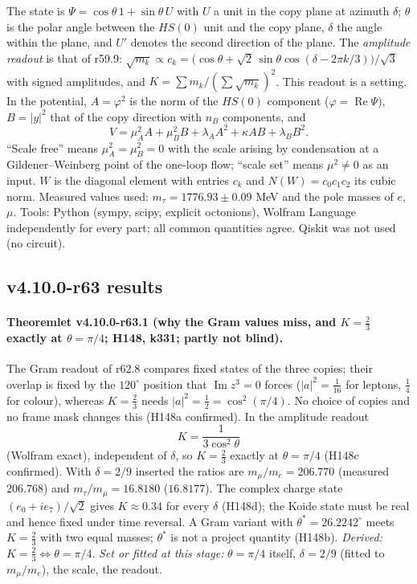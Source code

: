 The state is \(\Psi=\cos\theta\,1+\sin\theta\,U\) with \(U\) a unit in the copy plane at azimuth \(\delta\); \(\theta\) is the polar angle between
the \(HS(0)\) unit and the copy plane, \(\delta\) the angle within the plane, and \(U'\) denotes the second direction of the plane.  The
\emph{amplitude readout} is that of r59.9: \(\sqrt{m_k}\propto c_k=\bigl(\cos\theta+\sqrt2\,\sin\theta\cos(\delta-2\pi k/3)\bigr)/\sqrt3\) with signed amplitudes, and
\(K=\sum m_k/(\sum\sqrt{m_k})^2\).  This readout is a setting.  In the potential, \(A=\varphi^2\) is the norm of the \(HS(0)\) component
(\(\varphi=\operatorname{Re}\Psi\)), \(B=|y|^2\) that of the copy direction with \(n_B\) components, and
\[
V=\mu_A^2A+\mu_B^2B+\lambda_AA^2+\kappa AB+\lambda_BB^2 .
\]
``Scale free'' means \(\mu_A^2=\mu_B^2=0\) with the scale arising by condensation at a Gildener--Weinberg point of the one-loop flow; ``scale
set'' means \(\mu^2\ne0\) as an input.  \(W\) is the diagonal element with entries \(c_k\) and \(N(W)=c_0c_1c_2\) its cubic norm.  Measured values
used: \(m_\tau=1776.93\pm0.09\) MeV and the pole masses of \(e\), \(\mu\).  Tools: Python (sympy, scipy, explicit octonions), Wolfram Language
independently for every part; all common quantities agree.  Qiskit was not used (no circuit).

\subsection*{v4.10.0-r63 results}
\label{subsec:v4100-r63-results}

\paragraph{Theoremlet v4.10.0-r63.1 (why the Gram values miss, and \(K=\tfrac23\) exactly at \(\theta=\pi/4\); H148, k331; partly not blind).}
The Gram readout of r62.8 compares fixed states of the three copies; their overlap is fixed by the \(120^\circ\) position that
\(\operatorname{Im}z^3=0\) forces (\(|a|^2=\tfrac1{16}\) for leptons, \(\tfrac14\) for colour), whereas \(K=\tfrac23\) needs
\(|a|^2=\tfrac12=\cos^2(\pi/4)\).  No choice of copies and no frame mask changes this (H148a confirmed).  In the amplitude readout
\[
K=\frac{1}{3\cos^2\theta}
\]
(Wolfram exact), independent of \(\delta\), so \(K=\tfrac23\) exactly at \(\theta=\pi/4\) (H148c confirmed).  With \(\delta=2/9\) inserted the
ratios are \(m_\mu/m_e=206.770\) (measured \(206.768\)) and \(m_\tau/m_\mu=16.8180\) (\(16.8177\)).  The complex charge state
\((e_0+ie_7)/\sqrt2\) gives \(K\approx0.34\) for every \(\delta\) (H148d); the Koide state must be real and hence fixed under time reversal.  A
Gram variant with \(\theta^*=26.2242^\circ\) meets \(K=\tfrac23\) with two equal masses; \(\theta^*\) is not a project quantity (H148b).
\emph{Derived:} \(K=\tfrac23\Leftrightarrow\theta=\pi/4\).  \emph{Set or fitted at this stage:} \(\theta=\pi/4\) itself, \(\delta=2/9\) (fitted to
\(m_\mu/m_e\)), the scale, the readout.

